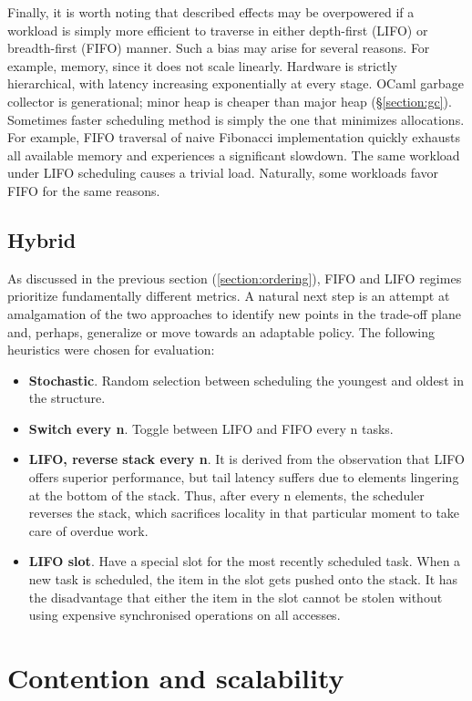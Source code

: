 \documentclass[12pt,a4paper,twoside]{report}
\begin{document}
Finally, it is worth noting that described effects may be overpowered if a workload is simply more efficient to traverse in either depth-first (LIFO) or breadth-first (FIFO) manner. Such a bias may arise for several reasons. For example, memory, since it does not scale linearly. Hardware is strictly hierarchical, with latency increasing exponentially at every stage. OCaml garbage collector is generational; minor heap is cheaper than major heap (\S\ref{section:gc}). Sometimes faster scheduling method is simply the one that minimizes allocations. For example, FIFO traversal of naive Fibonacci implementation quickly exhausts all available memory and experiences a significant slowdown. The same workload under LIFO scheduling causes a trivial load. Naturally, some workloads favor FIFO for the same reasons.

\subsection{Hybrid}
As discussed in the previous section (\ref{section:ordering}), FIFO and LIFO regimes prioritize fundamentally different metrics. A natural next step is an attempt at amalgamation of the two approaches to identify new points in the trade-off plane and, perhaps, generalize or move towards an adaptable policy. The following heuristics were chosen for evaluation: 


\begin{itemize}
    \item \textbf{Stochastic}. Random selection between scheduling the youngest and oldest in the structure. 
    \item \textbf{Switch every n}. Toggle between LIFO and FIFO every n tasks.
    \item \textbf{LIFO, reverse stack every n}. It is derived from the observation that LIFO offers superior performance, but tail latency suffers due to elements lingering at the bottom of the stack. Thus, after every n elements, the scheduler reverses the stack, which sacrifices locality in that particular moment to take care of overdue work.    
    \item \textbf{LIFO slot}. Have a special slot for the most recently scheduled task. When a new task is scheduled, the item in the slot gets pushed onto the stack. It has the disadvantage that either the item in the slot cannot be stolen without using expensive synchronised operations on all accesses.
\end{itemize}


\section{Contention and scalability}
\label{section:global_local}
\end{document}

